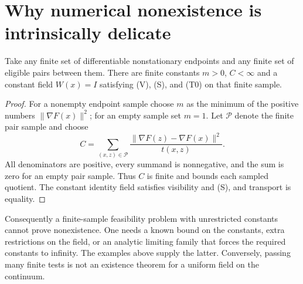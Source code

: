 \section{Why numerical nonexistence is intrinsically delicate}
\begin{proposition}
Take any finite set of differentiable nonstationary endpoints and any finite set of eligible pairs between them. There are finite constants $m>0$, $C<\infty$ and a constant field $W(x)=I$ satisfying (V), (S), and (T0) on that finite sample.
\end{proposition}
\begin{proof}
For a nonempty endpoint sample choose $m$ as the minimum of the positive numbers $\|\nabla F(x)\|^2$; for an empty sample set $m=1$. Let $\mathcal P$ denote the finite pair sample and choose
\[
 C=\sum_{(x,z)\in\mathcal P}
       \frac{\|\nabla F(z)-\nabla F(x)\|^2}{t(x,z)}.
\]
All denominators are positive, every summand is nonnegative, and the sum is zero for an empty pair sample. Thus $C$ is finite and bounds each sampled quotient. The constant identity field satisfies visibility and (S), and transport is equality.
\end{proof}
Consequently a finite-sample feasibility problem with unrestricted constants cannot prove nonexistence. One needs a known bound on the constants, extra restrictions on the field, or an analytic limiting family that forces the required constants to infinity. The examples above supply the latter. Conversely, passing many finite tests is not an existence theorem for a uniform field on the continuum.


\endgroup
